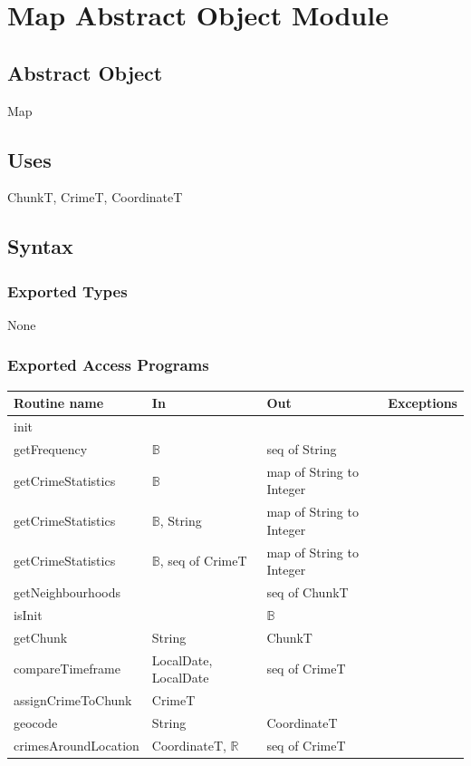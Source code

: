 \documentclass[12pt]{article}
\begin{document}
\newpage

\section* {Map Abstract Object Module}

\subsection*{Abstract Object}

Map

\subsection* {Uses}

ChunkT, CrimeT, CoordinateT

\subsection* {Syntax}

\subsubsection* {Exported Types}

None

\subsubsection* {Exported Access Programs}

\begin{tabular}{| l | l | l | l |}
\hline
\textbf{Routine name} & \textbf{In} & \textbf{Out} & \textbf{Exceptions}\\
\hline
init & ~ & ~ & \\
\hline
getFrequency & $\mathbb{B}$ & seq of String & ~\\
\hline
getCrimeStatistics & $\mathbb{B}$ & map of String to Integer & ~\\
\hline
getCrimeStatistics & $\mathbb{B}$, String & map of String to Integer & ~\\
\hline
getCrimeStatistics & $\mathbb{B}$, seq of CrimeT & map of String to Integer & ~\\
\hline
getNeighbourhoods & ~ & seq of ChunkT & ~\\
\hline
isInit & ~ & $\mathbb{B}$ & ~\\
\hline
getChunk & String & ChunkT & ~\\
\hline
compareTimeframe & LocalDate, LocalDate & seq of CrimeT & ~\\
\hline
assignCrimeToChunk & CrimeT & ~ & ~\\
\hline
geocode & String & CoordinateT & ~\\
\hline
crimesAroundLocation & CoordinateT, $\mathbb{R}$ & seq of CrimeT & ~\\
\hline
\end{tabular}
\end{document}
